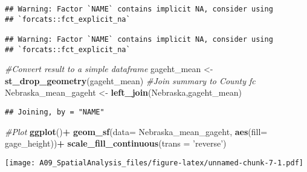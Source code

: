\documentclass[]{article}
\newenvironment{Shaded}{\begin{snugshade}}{\end{snugshade}}
\newcommand{\KeywordTok}[1]{\textcolor[rgb]{0.13,0.29,0.53}{\textbf{#1}}}
\newcommand{\DataTypeTok}[1]{\textcolor[rgb]{0.13,0.29,0.53}{#1}}
\newcommand{\StringTok}[1]{\textcolor[rgb]{0.31,0.60,0.02}{#1}}
\newcommand{\CommentTok}[1]{\textcolor[rgb]{0.56,0.35,0.01}{\textit{#1}}}
\newcommand{\OperatorTok}[1]{\textcolor[rgb]{0.81,0.36,0.00}{\textbf{#1}}}
\newcommand{\NormalTok}[1]{#1}
\begin{document}
\begin{verbatim}
## Warning: Factor `NAME` contains implicit NA, consider using
## `forcats::fct_explicit_na`

## Warning: Factor `NAME` contains implicit NA, consider using
## `forcats::fct_explicit_na`
\end{verbatim}

\begin{Shaded}
\begin{Highlighting}[]
\CommentTok{#Convert result to a simple dataframe}
\NormalTok{gageht_mean <-}\StringTok{ }\KeywordTok{st_drop_geometry}\NormalTok{(gageht_mean)}
\CommentTok{#Join summary to County fc}
\NormalTok{Nebraska_mean_gageht <-}\StringTok{ }\KeywordTok{left_join}\NormalTok{(Nebraska,gageht_mean)}
\end{Highlighting}
\end{Shaded}

\begin{verbatim}
## Joining, by = "NAME"
\end{verbatim}

\begin{Shaded}
\begin{Highlighting}[]
\CommentTok{#Plot}
\KeywordTok{ggplot}\NormalTok{()}\OperatorTok{+}
\StringTok{  }\KeywordTok{geom_sf}\NormalTok{(}\DataTypeTok{data=}\NormalTok{ Nebraska_mean_gageht, }\KeywordTok{aes}\NormalTok{(}\DataTypeTok{fill=}\NormalTok{ gage_height))}\OperatorTok{+}
\StringTok{  }\KeywordTok{scale_fill_continuous}\NormalTok{(}\DataTypeTok{trans =} \StringTok{'reverse'}\NormalTok{)}
\end{Highlighting}
\end{Shaded}

\texttt{[image: A09\_SpatialAnalysis\_files/figure-latex/unnamed-chunk-7-1.pdf]}
\end{document}
